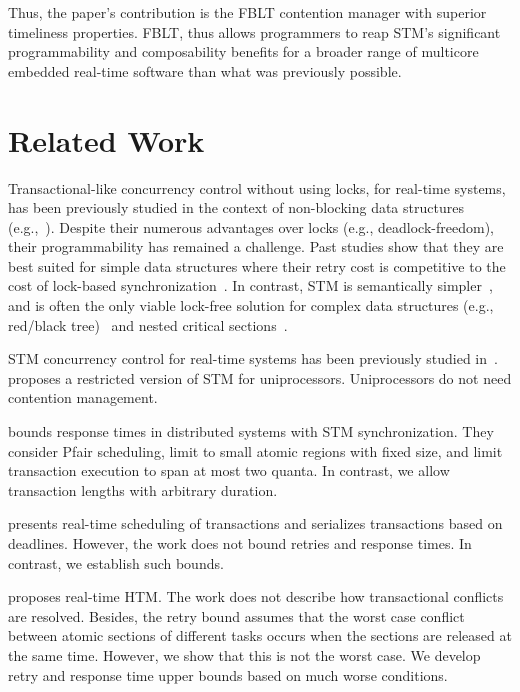 \documentclass[conference]{IEEEtran}
\begin{document}
Thus, the paper's contribution is the FBLT contention manager with superior timeliness properties. FBLT, thus allows programmers to reap STM's significant programmability and composability benefits for a broader range of multicore embedded real-time software than what was previously possible.
%
\section{Related Work}
\label{sec:past}

Transactional-like concurrency control without using locks, for real-time systems, has been previously studied in the context of non-blocking data structures (e.g.,~\cite{anderson95realtime}). Despite their numerous advantages over locks 
(e.g., deadlock-freedom), their programmability has remained a challenge. 
Past studies show that they are best suited for simple data structures where their retry cost is competitive to the cost of lock-based synchronization~\cite{bc+08}.  In contrast, STM is semantically simpler~\cite{Herlihy:2006:AMP:1146381.1146382}, and is often the only viable lock-free solution for complex data structures (e.g., red/black tree)~\cite{key-1} and nested critical sections~\cite{Saha:2006:MHP:1122971.1123001}.

STM concurrency control for real-time systems has been previously studied in~\cite{manson2006preemptible,fahmy2009bounding,sarni2009real,schoeberl2010rttm,key-1,barrosmanaging,stmconcurrencycontrol:emsoft11,lcmdac2012,shambake_phd_proposal}.
 \cite{manson2006preemptible} proposes a restricted version of STM for uniprocessors. Uniprocessors do not need contention management.

\cite{fahmy2009bounding} bounds response times in distributed  systems with STM synchronization. They consider Pfair scheduling, limit to small atomic regions with fixed size, and limit transaction execution to span at most two quanta. In contrast, we allow transaction lengths with  arbitrary duration.

\cite{sarni2009real} presents real-time scheduling of transactions and serializes transactions based on deadlines. However, the work does not bound retries and response times. In contrast, we establish such bounds.

\cite{schoeberl2010rttm} proposes real-time HTM. The work does not describe how transactional conflicts are resolved. Besides, the retry bound assumes that the worst case conflict between atomic sections of different tasks occurs when the sections are released at the same time. However, we show that this is not the worst case. We develop retry and response time upper bounds based on much worse conditions.
\end{document}
